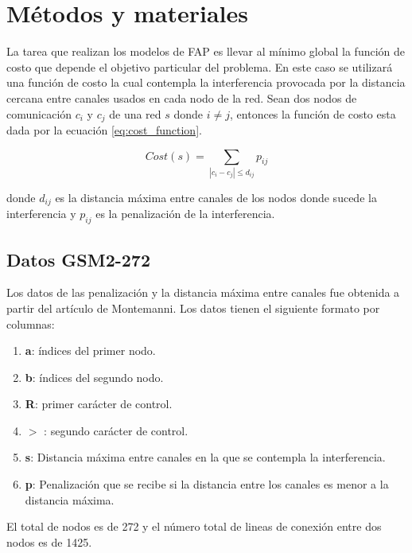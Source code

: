
\section{Métodos y materiales}

La tarea que realizan los modelos de FAP es llevar al mínimo global la función de costo que depende el objetivo particular del problema. En este caso se utilizará una función de costo la cual contempla la interferencia provocada por la distancia cercana entre canales usados en cada nodo de la red. Sean dos nodos de comunicación $c_i$ y $c_j$ de una red $s$ donde $i\neq j$, entonces la función de costo esta dada por la ecuación \ref{eq:cost_function}.

\begin{equation}
    Cost(s) = \sum_{|c_i-c_j| \leq d_{ij}} p_{ij} \label{eq:cost_function}
\end{equation}

donde $d_{ij}$ es la distancia máxima entre canales de los nodos donde sucede la interferencia y $p_{ij}$ es la penalización de la interferencia.

\subsection{Datos GSM2-272}

Los datos de las penalización y la distancia máxima entre canales fue obtenida a partir del artículo de Montemanni\cite{Montemanni_2010,data}. Los datos tienen el siguiente formato por columnas:

\begin{enumerate}
    \item \textbf{a}: índices del primer nodo.
    \item \textbf{b}: índices del segundo nodo.
    \item \textbf{R}: primer carácter de control.
    \item $>$ : segundo carácter de control.
    \item \textbf{s}: Distancia máxima entre canales en la que se contempla la interferencia.
    \item \textbf{p}: Penalización que se recibe si la distancia entre los canales es menor a la distancia máxima.
\end{enumerate}

El total de nodos es de 272 y el número total de lineas de conexión entre dos nodos es de 1425.

